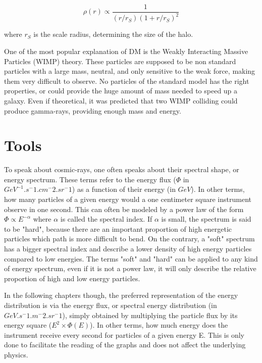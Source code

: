 \begin{equation}
\rho (r) \propto \frac{1}{\left( r/r_S \right) \left( 1 + r/r_S \right)^2 }
\end{equation}

where $r_S$ is the scale radius, determining the size of the halo.


One of the most popular explanation of DM is the Weakly Interacting Massive Particles (WIMP) theory. These particles are supposed to be non standard particles with a large mass, neutral, and only sensitive to the weak force, making them very difficult to observe. No particles of the standard model has the right properties, or could provide the huge amount of mass needed to speed up a galaxy.
Even if theoretical, it was predicted that two WIMP colliding could produce gamma-rays, providing enough mass and energy.


\section{Tools}

To speak about cosmic-rays, one often speaks about their spectral shape, or energy spectrum. These terms refer to the energy flux ($\Phi$ in $GeV^{-1}.s^-1.cm^-2.sr^-1$) as a function of their energy (in $GeV$). In other terms, how many particles of a given energy would a one centimeter square instrument observe in one second. This can often be modeled by a power law of the form $\Phi \propto E^{-\alpha}$  where $\alpha$ is called the spectral index. If $\alpha$ is small, the spectrum is said to be "hard", because there are an important proportion of high energetic particles which path is more difficult to bend. On the contrary, a "soft" spectrum has a bigger spectral index and describe a lower density of high energy particles compared to low energies. The terms "soft" and "hard" can be applied to any kind of energy spectrum, even if it is not a power law, it will only describe the relative proportion of high and low energy particles.

In the following chapters though, the preferred representation of the energy distribution is via the energy flux, or spectral energy distribution (in $GeV.s^-1.m^-2.sr^-1$), simply obtained by multiplying the particle flux by its energy square ($E^2 \times \Phi(E)$). In other terms, how much energy does the instrument receive every second for particles of a given energy E. This is only done to facilitate the reading of the graphs and does not affect the underlying physics.




